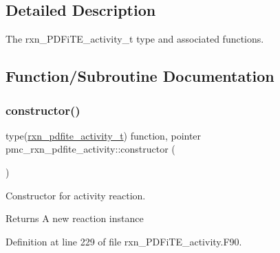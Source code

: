 \subsection{Detailed Description}
The rxn\+\_\+\+P\+D\+Fi\+T\+E\+\_\+activity\+\_\+t type and associated functions. 

\subsection{Function/\+Subroutine Documentation}
\mbox{\label{namespacepmc__rxn__pdfite__activity_a3c0413f9ba4125dfa77c0c1e88b847a1}} 
\subsubsection{\texorpdfstring{constructor()}{constructor()}}
{\footnotesize\ttfamily type(\mbox{\hyperlink{structpmc__rxn__pdfite__activity_1_1rxn__pdfite__activity__t}{rxn\+\_\+pdfite\+\_\+activity\+\_\+t}}) function, pointer pmc\+\_\+rxn\+\_\+pdfite\+\_\+activity\+::constructor (\begin{DoxyParamCaption}{ }\end{DoxyParamCaption})\hspace{0.3cm}{\ttfamily [private]}}



Constructor for activity reaction. 

\begin{DoxyReturn}{Returns}
A new reaction instance 
\end{DoxyReturn}


Definition at line 229 of file rxn\+\_\+\+P\+D\+Fi\+T\+E\+\_\+activity.\+F90.

\mbox{\label{namespacepmc__rxn__pdfite__activity_aabaa82aa9a7850318a120845b3fd8512}} 
